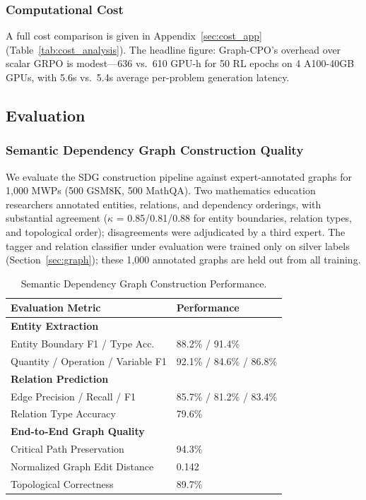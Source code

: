 \documentclass[sigconf, anonymous, review, screen]{acmart}
\begin{document}
\subsubsection{Computational Cost}
\label{sec:cost}
A full cost comparison is given in Appendix~\ref{sec:cost_app} (Table~\ref{tab:cost_analysis}). The headline figure: Graph-CPO's overhead over scalar GRPO is modest---636 vs.\ 610 GPU-h for 50 RL epochs on 4 A100-40GB GPUs, with 5.6s vs.\ 5.4s average per-problem generation latency.


\subsection{Evaluation}

\subsubsection{Semantic Dependency Graph Construction Quality}
\label{sec:sdg_eval}

We evaluate the SDG construction pipeline against expert-annotated graphs for 1,000 MWPs
(500 GSM8K, 500 MathQA). Two mathematics education researchers annotated entities, relations, and
dependency orderings, with substantial agreement ($\kappa$ = 0.85/0.81/0.88 for entity boundaries,
relation types, and topological order); disagreements were adjudicated by a third expert. The tagger
and relation classifier under evaluation were trained only on silver labels (Section~\ref{sec:graph});
these 1,000 annotated graphs are held out from all training.

\begin{table}[htbp]
\centering
\caption{Semantic Dependency Graph Construction Performance.}
\label{tab:pipeline_performance}

\begin{tabular}{l l}
\toprule
\textbf{Evaluation Metric} & \textbf{Performance} \\
\midrule
\multicolumn{2}{l}{\textbf{Entity Extraction}} \\
Entity Boundary F1 / Type Acc. & 88.2\% / 91.4\% \\
Quantity / Operation / Variable F1 & 92.1\% / 84.6\% / 86.8\% \\
\midrule
\multicolumn{2}{l}{\textbf{Relation Prediction}} \\
Edge Precision / Recall / F1 & 85.7\% / 81.2\% / 83.4\% \\
Relation Type Accuracy & 79.6\% \\
\midrule
\multicolumn{2}{l}{\textbf{End-to-End Graph Quality}} \\
Critical Path Preservation & 94.3\% \\
Normalized Graph Edit Distance & 0.142 \\
Topological Correctness & 89.7\% \\
\bottomrule
\end{tabular}

\end{table}
\end{document}
